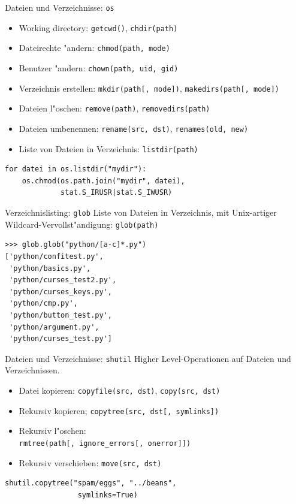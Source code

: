 \begin{frame}[fragile]{Dateien und Verzeichnisse: \texttt{os}}
\begin{itemize}
\item Working directory: \lstinline{getcwd()}, \lstinline{chdir(path)}
\item Dateirechte "andern: \lstinline{chmod(path, mode)}
\item Benutzer "andern: \lstinline{chown(path, uid, gid)}
\item Verzeichnis erstellen: \lstinline{mkdir(path[, mode])}, \lstinline{makedirs(path[, mode])}
\item Dateien l"oschen: \lstinline{remove(path)}, \lstinline{removedirs(path)}
\item Dateien umbenennen: \lstinline{rename(src, dst)}, \lstinline{renames(old, new)}
\item Liste von Dateien in Verzeichnis: \lstinline{listdir(path)}
\end{itemize}
\begin{lstlisting}[style=Python]
for datei in os.listdir("mydir"):
    os.chmod(os.path.join("mydir", datei), 
             stat.S_IRUSR|stat.S_IWUSR)
\end{lstlisting}
\end{frame} 

\begin{frame}[fragile]{Verzeichnislisting: \texttt{glob}}
Liste von Dateien in Verzeichnis, mit Unix-artiger Wildcard-Vervollst"andigung: \texttt{glob(path)}
\begin{lstlisting}[style=Shell]
>>> glob.glob("python/[a-c]*.py")
['python/confitest.py',
 'python/basics.py',
 'python/curses_test2.py',
 'python/curses_keys.py',
 'python/cmp.py',
 'python/button_test.py',
 'python/argument.py',
 'python/curses_test.py']
\end{lstlisting}
\end{frame}

\begin{frame}[fragile]{Dateien und Verzeichnisse: \texttt{shutil}}
Higher Level-Operationen auf Dateien und Verzeichnissen.
\begin{itemize}
\item Datei kopieren: \texttt{copyfile(src, dst)}, \texttt{copy(src, dst)}
\item Rekursiv kopieren; \texttt{copytree(src, dst[, symlinks])}
\item Rekursiv l"oschen: \\\texttt{rmtree(path[, ignore\_errors[, onerror]])}
\item Rekursiv verschieben: \texttt{move(src, dst)}
\end{itemize}
\begin{lstlisting}[style=Python]
shutil.copytree("spam/eggs", "../beans", 
                 symlinks=True)
\end{lstlisting}
\end{frame}

